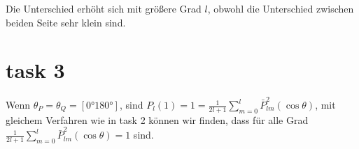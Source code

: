 \documentclass[12pt]{article}
\begin{document}
\begin{figure}[ht]
\end{figure}
\noindent Die Unterschied erhöht sich mit größere Grad $l$, obwohl die Unterschied zwischen beiden Seite sehr klein sind.\newpage 
\section{task 3}
Wenn $\theta_P = \theta_Q = [0° 180°]$, sind $P_l(1) = 1 = \frac{1}{2l+1}\sum_{m=0}^{l}\bar{P}_{lm}^2(\cos \theta)$, mit gleichem Verfahren wie in task 2 können wir finden, dass für alle Grad $\frac{1}{2l+1}\sum_{m=0}^{l}\bar{P}_{lm}^2(\cos \theta) = 1$ sind.  
\begin{figure}[ht]\centering
\end{figure}
\end{document}
